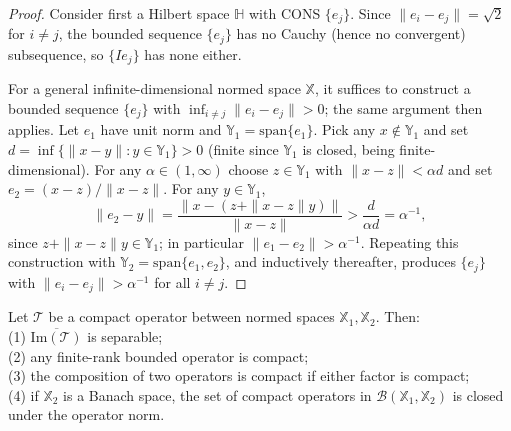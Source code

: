 \begin{proof}
Consider first a Hilbert space $\mathbb{H}$ with CONS $\{e_j\}$. Since
$\|e_i-e_j\| = \sqrt{2}$ for $i\neq j$, the bounded sequence $\{e_j\}$ has
no Cauchy (hence no convergent) subsequence, so $\{Ie_j\}$ has none either.

For a general infinite-dimensional normed space $\mathbb{X}$, it suffices
to construct a bounded sequence $\{e_j\}$ with
$\inf_{i\neq j}\|e_i-e_j\|>0$; the same argument then applies. Let $e_1$
have unit norm and $\mathbb{Y}_1=\mathrm{span}\{e_1\}$. Pick any
$x\notin\mathbb{Y}_1$ and set $d=\inf\{\|x-y\|:y\in\mathbb{Y}_1\}>0$
(finite since $\mathbb{Y}_1$ is closed, being finite-dimensional). For any
$\alpha\in(1,\infty)$ choose $z\in\mathbb{Y}_1$ with $\|x-z\|<\alpha d$ and
set $e_2 = (x-z)/\|x-z\|$. For any $y\in\mathbb{Y}_1$,
\[
\|e_2-y\| = \frac{\|x-(z+\|x-z\|y)\|}{\|x-z\|} > \frac{d}{\alpha d} =
\alpha^{-1},
\]
since $z+\|x-z\|y\in\mathbb{Y}_1$; in particular $\|e_1-e_2\|>\alpha^{-1}$.
Repeating this construction with $\mathbb{Y}_2=\mathrm{span}\{e_1,e_2\}$,
and inductively thereafter, produces $\{e_j\}$ with $\|e_i-e_j\|>\alpha^{-1}$
for all $i\neq j$.
\end{proof}

\begin{theorem}
\label{thm:compact_props}
Let $\mathcal{T}$ be a compact operator between normed spaces
$\mathbb{X}_1,\mathbb{X}_2$. Then: \\
(1) $\overline{\mathrm{Im}(\mathcal{T})}$
is separable; \\
(2) any finite-rank bounded operator is compact; \\
(3) the composition of two operators is compact if either factor is compact; \\
(4) if $\mathbb{X}_2$ is a Banach space, the set of compact operators in
$\mathcal{B}(\mathbb{X}_1,\mathbb{X}_2)$ is closed under the operator norm.
\end{theorem}


